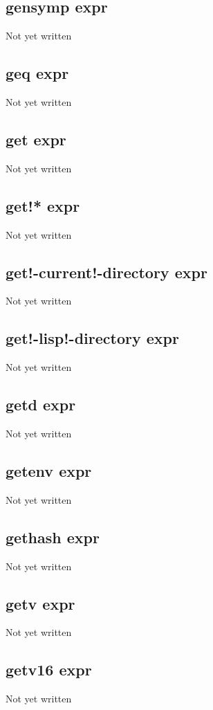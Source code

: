 \documentclass[a4paper,11pt]{article}
\begin{document}
\subsection{\ttfamily gensymp expr}
Not yet written

\subsection{\ttfamily geq expr}
Not yet written

\subsection{\ttfamily get expr}
Not yet written

\subsection{\ttfamily get!* expr}
Not yet written

\subsection{\ttfamily get!-current!-directory expr}
Not yet written

\subsection{\ttfamily get!-lisp!-directory expr}
Not yet written

\subsection{\ttfamily getd expr}
Not yet written

\subsection{\ttfamily getenv expr}
Not yet written

\subsection{\ttfamily gethash expr}
Not yet written

\subsection{\ttfamily getv expr}
Not yet written

\subsection{\ttfamily getv16 expr}
Not yet written
\end{document}
